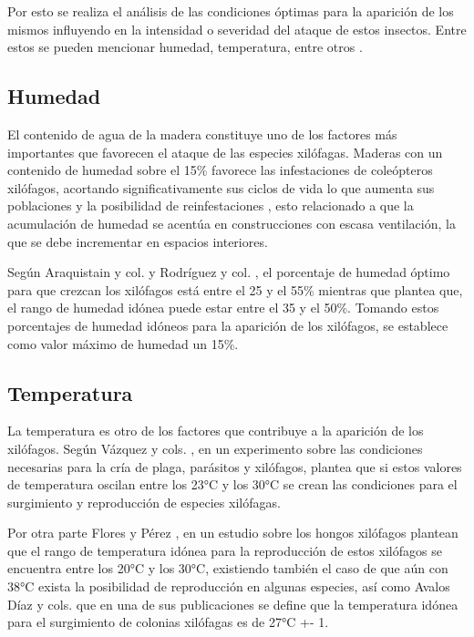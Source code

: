     Por esto se realiza el análisis de las condiciones óptimas para la aparición de los mismos influyendo en la intensidad o severidad del ataque de estos insectos. Entre estos se pueden mencionar humedad, temperatura, entre otros \cite{ripa2004termitas}. 
    
    \subsection{Humedad}

    El contenido de agua de la madera constituye uno de los factores más importantes que favorecen el ataque de las especies xilófagas. Maderas con un contenido de humedad sobre el 15\% favorece las infestaciones de coleópteros xilófagos, acortando significativamente sus ciclos de vida lo que aumenta sus poblaciones y la posibilidad de reinfestaciones \cite{ripa2004termitas}, esto relacionado a que la acumulación de humedad se acentúa en construcciones con escasa ventilación, la que se debe incrementar en espacios interiores.

    Según Araquistain y col. \cite{monitoringMoisture} y Rodríguez y col. \cite{rodriguezcodigo}, el porcentaje de humedad óptimo para que crezcan los xilófagos está entre el 25 y el 55\% mientras que \cite{woodPreservation} plantea que, el rango de humedad idónea puede estar entre el 35 y el 50\%. Tomando estos porcentajes de humedad idóneos para la aparición de los xilófagos, se establece como valor máximo de humedad un 15\%.

    \subsection{Temperatura}

    La temperatura es otro de los factores que contribuye a la aparición de los xilófagos. Según Vázquez y cols. \cite{vazquez1999avetianella}, en un experimento sobre las condiciones necesarias para la cría de plaga, parásitos y xilófagos, plantea que si estos valores de temperatura oscilan entre los 23°C y los 30°C se crean las condiciones para el surgimiento y reproducción de especies xilófagas. 

    Por otra parte Flores y Pérez \cite{floresDurabilidadNaturalDiez1987a}, en un estudio sobre los hongos xilófagos plantean que el rango de temperatura idónea para la reproducción de estos xilófagos se encuentra entre los 20°C y los 30°C, existiendo también el caso de que aún con 38°C exista la posibilidad de reproducción en algunas especies, así como Avalos Díaz y cols. \cite{avalosdiazInfluenciaDosHongos2020} que en una de sus publicaciones se define que la temperatura idónea para el surgimiento de colonias xilófagas es de 27°C +- 1.\\ 

